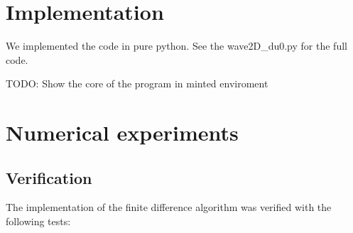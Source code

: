 \documentclass[twoside]{article}
\begin{document}
\section{Implementation}

We implemented the code in pure python. See the wave2D\_du0.py for the full code.

TODO: Show the core of the program in minted enviroment







\section{Numerical experiments}


\subsection{Verification}

The implementation of the finite difference algorithm was verified with the following tests:  
\end{document}
